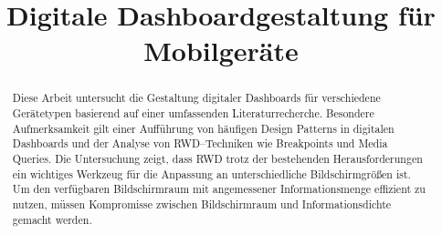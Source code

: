 \documentclass[conference,compsoc,final,a4paper]{IEEEtran}
\newcommand{\autoren}[0]{Wittmann, Yan}
\newcommand{\dokumententitel}[0]{Digitale Dashboardgestaltung für Mobilgeräte}
\begin{document}
    \title{\dokumententitel}

    \author{
        \IEEEauthorblockN{\autoren}
    }

    \maketitle
    \thispagestyle{plain}
    \pagestyle{plain}


    \begin{abstract}

        Diese Arbeit untersucht die Gestaltung digitaler Dashboards für verschiedene Gerätetypen basierend auf einer umfassenden Literaturrecherche.
        Besondere Aufmerksamkeit gilt einer Aufführung von häufigen Design Patterns in digitalen Dashboards und der Analyse von \acs{RWD}--Techniken wie Breakpoints und Media Queries.
        Die Untersuchung zeigt, dass \acs{RWD} trotz der bestehenden Herausforderungen ein wichtiges Werkzeug für die Anpassung an unterschiedliche Bildschirmgrößen ist.
        Um den verfügbaren Bildschirmraum mit angemessener Informationsmenge effizient zu nutzen, müssen Kompromisse zwischen Bildschirmraum und Informationsdichte gemacht werden.

    \end{abstract}

    \small\tableofcontents

\end{document}
